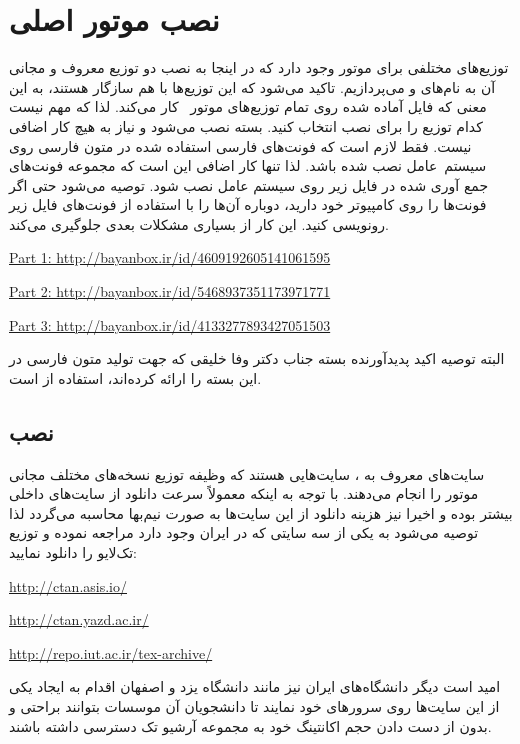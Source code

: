    \section{نصب موتور اصلی \lr{\TeX}}
    توزیع‌های مختلفی برای موتور \lr{\TeX} وجود دارد که در اینجا به نصب دو توزیع
    معروف و مجانی آن به نام‌های   و  می‌پردازیم. تاکید می‌شود که این توزیع‌ها با هم سازگار هستند، به این
    معنی که فایل آماده شده روی تمام توزیع‌های موتور \lr{\TeX} \ کار می‌کند. لذا که مهم نیست کدام
    توزیع را برای نصب انتخاب کنید.
    بسته \lr{\XePersian}  نصب می‌شود و نیاز به هیچ کار اضافی نیست. فقط لازم است
    که فونت‌های فارسی استفاده شده در متون فارسی روی سیستم~عامل نصب شده باشد. لذا
    تنها کار اضافی این است که مجموعه فونت‌های جمع آوری شده در فایل زیر روی سیستم عامل
    نصب شود. توصیه می‌شود حتی اگر فونت‌ها را روی کامپیوتر خود دارید، دوباره آن‌ها را با استفاده
    از فونت‌های فایل زیر رونویسی کنید. این کار از بسیاری مشکلات بعدی جلوگیری می‌کند.
    \begin{latin}

    \href{http://bayanbox.ir/id/4609192605141061595}{Part 1: http://bayanbox.ir/id/4609192605141061595}

    \href{http://bayanbox.ir/id/5468937351173971771}{Part 2: http://bayanbox.ir/id/5468937351173971771}

    \href{http://bayanbox.ir/id/4133277893427051503}{Part 3: http://bayanbox.ir/id/4133277893427051503}
    \end{latin}

    البته توصیه اکید پدیدآورنده بسته \lr{\XePersian} جناب دکتر وفا خلیقی  که جهت تولید متون فارسی در \lr{\TeX} 
    این بسته را ارائه کرده‌اند، استفاده از    است. 
    \subsection{نصب }
    سایت‌های معروف به ، سایت‌هایی هستند که  وظیفه توزیع نسخه‌های مختلف
    مجانی موتور \lr{\TeX} را انجام می‌دهند. با توجه به اینکه معمولاً سرعت دانلود از سایت‌های داخلی 
    بیشتر بوده و اخیرا نیز هزینه دانلود از این سایت‌ها به صورت نیم‌بها محاسبه می‌گردد لذا توصیه می‌شود به یکی از سه 
    سایتی که در ایران وجود دارد مراجعه نموده و توزیع تک‌لایو را دانلود نمایید:
    \begin{enumerate}
        \begin{LTRitems}
            \item \url{http://ctan.asis.io/}
            \item \url{http://ctan.yazd.ac.ir/}
            \item \url{http://repo.iut.ac.ir/tex-archive/}
        \end{LTRitems}
    \end{enumerate}
        امید است دیگر دانشگاه‌های ایران نیز مانند دانشگاه یزد و اصفهان اقدام به ایجاد یکی از این سایت‌ها روی سرورهای خود نمایند تا دانشجویان آن موسسات 
        بتوانند براحتی و بدون از دست دادن حجم اکانتینگ خود به مجموعه آرشیو تک دسترسی داشته باشند. 

